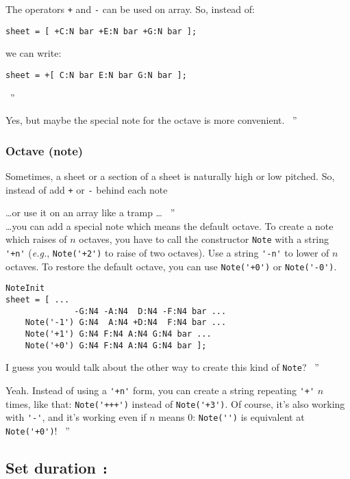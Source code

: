 \documentclass{article}
\newcommand{\note}{\lstinline!Note!\xspace}
\newcommand{\eg}{\emph{e.g.}\xspace}
\newenvironment{meenv}{ \par \noindent \makebox[6em][r]{ \textcolor{mecolor}{Me}: `` --~}}{~''}
\newenvironment{myselfenv}{ \par \noindent \makebox[6em][r]{ \textcolor{myselfcolor}{Myself}: `` --~}}{~''}
\newcommand{ \me }[1]{%
\begin{meenv}%
	#1%
\end{meenv} }
\newcommand{ \myself }[1]{%
\begin{myselfenv}%
	#1%
\end{myselfenv} }
\begin{document}
\begin{meenv}%
The operators \lstinline!+! and \lstinline!-! can be used on array. So, instead of:
\begin{lstlisting}
sheet = [ +C:N bar +E:N bar +G:N bar ];
\end{lstlisting}
we can write:
\begin{lstlisting}
sheet = +[ C:N bar E:N bar G:N bar ];
\end{lstlisting}%
\end{meenv}
\myself{Yes, but maybe the special note for the octave is more convenient.}

\subsubsection{Octave (note)}
\label{sec:OctaveNote}

Sometimes, a sheet or a section of a sheet is naturally high or low pitched. So, instead of add \lstinline!+! or \lstinline!-! behind each note
\myself{\dots or use it on an array like a tramp \dots} \\
\dots you can add a special note which means the default octave. To create a note which raises of $n$ octaves, you have to call the constructor \note with a string \lstinline!'+n'! (\eg, \lstinline!Note('+2')! to raise of two octaves). Use a string \lstinline!'-n'! to lower of $n$ octaves. To restore the default octave, you can use \lstinline!Note('+0')! or \lstinline!Note('-0')!. \\

\begin{lstlisting}
NoteInit
sheet = [ ...
	          -G:N4 -A:N4  D:N4 -F:N4 bar ...
	Note('-1') G:N4  A:N4 +D:N4  F:N4 bar ...
	Note('+1') G:N4 F:N4 A:N4 G:N4 bar ...
	Note('+0') G:N4 F:N4 A:N4 G:N4 bar ];
\end{lstlisting}

\myself{I guess you would talk about the other way to create this kind of \note?}
\me{Yeah. Instead of using a \lstinline!'+n'! form, you can create a string repeating \lstinline!'+'! $n$ times, like that: \lstinline!Note('+++')! instead of \lstinline!Note('+3')!. Of course, it's also working with \lstinline!'-'!, and it's working even if $n$ means $0$: \lstinline!Note('')! is equivalent at \lstinline!Note('+0')!!}

\subsection{Set duration \lstinline!:!}
\label{sec:SetDuration}
\end{document}
